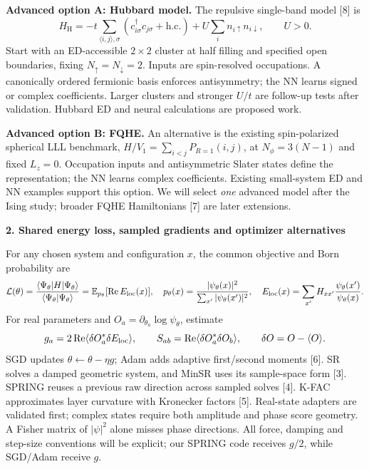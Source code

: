 \documentclass[10pt,letterpaper]{article}
\newcommand{\topic}[1]{\vspace{4pt}\textbf{\color{ink}#1}\par}
\begin{document}
\textbf{Advanced option A: Hubbard model.} The repulsive single-band model [8] is
\begin{equation}
 H_{\mathrm H}=-t\sum_{\langle i,j\rangle,\sigma}
 (c^\dagger_{i\sigma}c_{j\sigma}+\mathrm{h.c.})+U\sum_i n_{i\uparrow}n_{i\downarrow},\qquad U>0.
\end{equation}
Start with an ED-accessible $2\times2$ cluster at half filling and specified open boundaries, fixing $N_\uparrow=N_\downarrow=2$. Inputs are spin-resolved occupations. A canonically ordered fermionic basis enforces antisymmetry; the NN learns signed or complex coefficients. Larger clusters and stronger $U/t$ are follow-up tests after validation. Hubbard ED and neural calculations are proposed work.

\textbf{Advanced option B: FQHE.} An alternative is the existing spin-polarized spherical LLL benchmark, $H/V_1=\sum_{i<j}P_{R=1}(i,j)$, at $N_\phi=3(N-1)$ and fixed $L_z=0$. Occupation inputs and antisymmetric Slater states define the representation; the NN learns complex coefficients. Existing small-system ED and NN examples support this option. We will select \emph{one} advanced model after the Ising study; broader FQHE Hamiltonians [7] are later extensions.

\topic{2. Shared energy loss, sampled gradients and optimizer alternatives}
For any chosen system and configuration $x$, the common objective and Born probability are
\begin{equation}
 \mathcal L(\theta)=\frac{\langle\Psi_\theta|H|\Psi_\theta\rangle}
 {\langle\Psi_\theta|\Psi_\theta\rangle}
 =\mathbb E_{p_\theta}[\operatorname{Re}E_{\rm loc}(x)],\quad
 p_\theta(x)=\frac{|\psi_\theta(x)|^2}{\sum_{x'}|\psi_\theta(x')|^2},\quad
 E_{\rm loc}(x)=\sum_{x'}H_{xx'}\frac{\psi_\theta(x')}{\psi_\theta(x)} .
\end{equation}
For real parameters and $O_a=\partial_{\theta_a}\log\psi_\theta$, estimate
\begin{equation}
 g_a=2\operatorname{Re}\langle\delta O_a^*\delta E_{\rm loc}\rangle,
 \qquad S_{ab}=\operatorname{Re}\langle\delta O_a^*\delta O_b\rangle,
 \qquad \delta O=O-\langle O\rangle .
\end{equation}
SGD updates $\theta\leftarrow\theta-\eta g$; Adam adds adaptive first/second moments [6]. SR solves a damped geometric system, and MinSR uses its sample-space form [3]. SPRING reuses a previous raw direction across sampled solves [4]. K-FAC approximates layer curvature with Kronecker factors [5]. Real-state adapters are validated first; complex states require both amplitude and phase score geometry. A Fisher matrix of $|\psi|^2$ alone misses phase directions. All force, damping and step-size conventions will be explicit; our SPRING code receives $g/2$, while SGD/Adam receive $g$.
\end{document}
